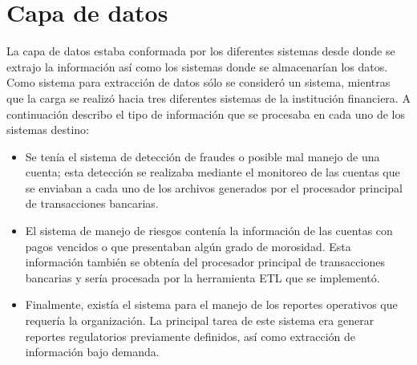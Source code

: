 \section{Capa de datos}

La capa de datos estaba conformada por los diferentes sistemas desde donde se
extrajo la información así como los sistemas donde se almacenarían los
datos. Como sistema para extracción de datos sólo se consideró un sistema,
mientras que la carga se realizó hacia tres diferentes sistemas de la
institución financiera. A continuación describo el tipo de información que se
procesaba en cada uno de los sistemas destino:

\begin{itemize}

\item Se tenía el sistema de detección de fraudes o posible mal manejo de una
  cuenta; esta detección se realizaba mediante el monitoreo de las cuentas que
  se enviaban a cada uno de los archivos generados por el procesador principal
  de transacciones bancarias.

\item El sistema de manejo de riesgos contenía la información de las cuentas
  con pagos vencidos o que presentaban algún grado de morosidad. Esta
  información también se obtenía del procesador principal de transacciones
  bancarias y sería procesada por la herramienta ETL que se implementó.

\item Finalmente, existía el sistema para el manejo de los reportes operativos
  que requería la organización. La principal tarea de este sistema era generar
  reportes regulatorios previamente definidos, así como extracción de
  información bajo demanda.
\end{itemize}

\cleardoublepage

